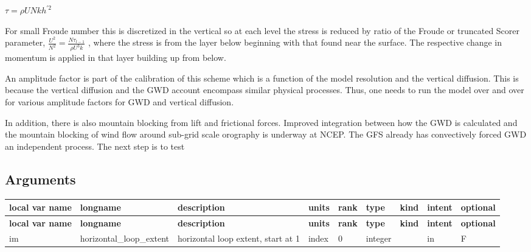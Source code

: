 $ \tau = \rho U N k h^{'2} $

For small Froude number this is discretized in the vertical so at each level the stress is reduced by ratio of the Froude or truncated Scorer parameter, $ \frac{U^{2}}{N^{2}} = \frac{N \tau_{l-1}}{\rho U^{3} k} $ , where the stress is from the layer below beginning with that found near the surface. The respective change in momentum is applied in that layer building up from below.

An amplitude factor is part of the calibration of this scheme which is a function of the model resolution and the vertical diffusion. This is because the vertical diffusion and the G\+WD account encompass similar physical processes. Thus, one needs to run the model over and over for various amplitude factors for G\+WD and vertical diffusion.

In addition, there is also mountain blocking from lift and frictional forces. Improved integration between how the G\+WD is calculated and the mountain blocking of wind flow around sub-\/grid scale orography is underway at N\+C\+EP. The G\+FS already has convectively forced G\+WD an independent process. The next step is to test\hypertarget{group___g_f_s__ogwd_arg_table_gwdps_run}{}\subsection{Arguments}\label{group___g_f_s__ogwd_arg_table_gwdps_run}
\tabulinesep=1mm
\begin{longtabu} spread 0pt [c]{*{9}{|X[-1]}|}
\hline
\rowcolor{\tableheadbgcolor}\textbf{ local var name }&\textbf{ longname }&\textbf{ description }&\textbf{ units }&\textbf{ rank }&\textbf{ type }&\textbf{ kind }&\textbf{ intent }&\textbf{ optional  }\\
\endfirsthead
\hline
\endfoot
\hline
\rowcolor{\tableheadbgcolor}\textbf{ local var name }&\textbf{ longname }&\textbf{ description }&\textbf{ units }&\textbf{ rank }&\textbf{ type }&\textbf{ kind }&\textbf{ intent }&\textbf{ optional  }\\
\endhead
im &horizontal\+\_\+loop\+\_\+extent &horizontal loop extent, start at 1 &index &0 &integer &&in &F \\
\end{longtabu}

